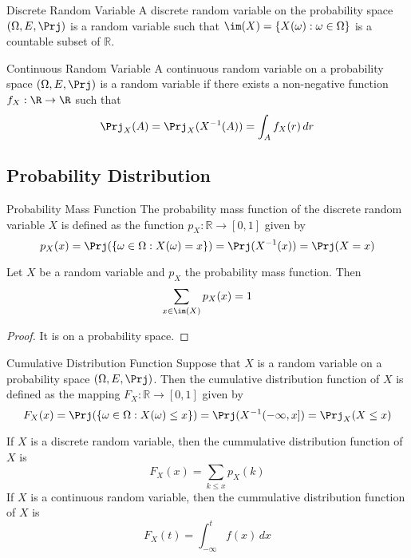 \documentclass[a4paper]{article}
\begin{document}
\begin{defn}{Discrete Random Variable}{} A discrete random variable on the probability space $(\Omega,E,\Prj)$ is a random variable such that $\im(X)=\{X(\omega):\omega\in\Omega\}$ is a countable subset of $\mathbb{R}$. 
\end{defn}

\begin{defn}{Continuous Random Variable}{} A continuous random variable on a probability space $(\Omega,E,\Prj)$ is a random variable if there exists a non-negative function $f_X:\R\to\R$ such that $$\Prj_X(A)=\Prj_X(X^{-1}(A))=\int_Af_X(r)\,dr$$
\end{defn}

\subsection{Probability Distribution}
\begin{defn}{Probability Mass Function}{} The probability mass function of the discrete random variable $X$ is defined as the function $p_X:\mathbb{R}\to[0,1]$ given by $$p_X(x)=\Prj(\{\omega\in\Omega:X(\omega)=x\})=\Prj(X^{-1}(x))=\Prj(X=x)$$
\end{defn}

\begin{lmm}{}{} Let $X$ be a random variable and $p_X$ the probability mass function. Then $$\sum_{x\in\im(X)}p_X(x)=1$$
\end{lmm}
\begin{proof} It is on a probability space. 
\end{proof}

\begin{defn}{Cumulative Distribution Function}{} Suppose that $X$ is a random variable on a probability space $(\Omega,E,\Prj)$. Then the cumulative distribution function of $X$ is defined as the mapping $F_X:\mathbb{R}\to[0,1]$ given by $$F_X(x)=\Prj(\{\omega\in\Omega:X(\omega)\leq x\})=\Prj(X^{-1}(-\infty,x])=\Prj_X(X\leq x)$$
\end{defn}

\begin{lmm}{}{} If $X$ is a discrete random variable, then the cummulative distribution function of $X$ is $$F_X(x)=\sum_{k\leq x}p_X(k)$$ If $X$ is a continuous random variable, then the cummulative distribution function of $X$ is $$F_X(t)=\int_{-\infty}^tf(x)\,dx$$
\end{lmm}
\end{document}

